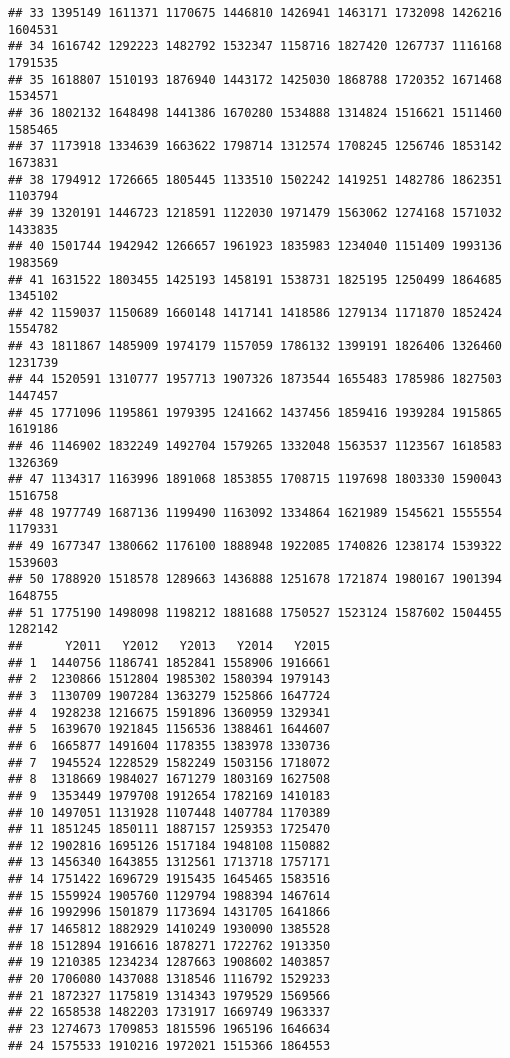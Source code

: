 \documentclass[
]{article}
\begin{document}
\begin{verbatim}
## 33 1395149 1611371 1170675 1446810 1426941 1463171 1732098 1426216 1604531
## 34 1616742 1292223 1482792 1532347 1158716 1827420 1267737 1116168 1791535
## 35 1618807 1510193 1876940 1443172 1425030 1868788 1720352 1671468 1534571
## 36 1802132 1648498 1441386 1670280 1534888 1314824 1516621 1511460 1585465
## 37 1173918 1334639 1663622 1798714 1312574 1708245 1256746 1853142 1673831
## 38 1794912 1726665 1805445 1133510 1502242 1419251 1482786 1862351 1103794
## 39 1320191 1446723 1218591 1122030 1971479 1563062 1274168 1571032 1433835
## 40 1501744 1942942 1266657 1961923 1835983 1234040 1151409 1993136 1983569
## 41 1631522 1803455 1425193 1458191 1538731 1825195 1250499 1864685 1345102
## 42 1159037 1150689 1660148 1417141 1418586 1279134 1171870 1852424 1554782
## 43 1811867 1485909 1974179 1157059 1786132 1399191 1826406 1326460 1231739
## 44 1520591 1310777 1957713 1907326 1873544 1655483 1785986 1827503 1447457
## 45 1771096 1195861 1979395 1241662 1437456 1859416 1939284 1915865 1619186
## 46 1146902 1832249 1492704 1579265 1332048 1563537 1123567 1618583 1326369
## 47 1134317 1163996 1891068 1853855 1708715 1197698 1803330 1590043 1516758
## 48 1977749 1687136 1199490 1163092 1334864 1621989 1545621 1555554 1179331
## 49 1677347 1380662 1176100 1888948 1922085 1740826 1238174 1539322 1539603
## 50 1788920 1518578 1289663 1436888 1251678 1721874 1980167 1901394 1648755
## 51 1775190 1498098 1198212 1881688 1750527 1523124 1587602 1504455 1282142
##      Y2011   Y2012   Y2013   Y2014   Y2015
## 1  1440756 1186741 1852841 1558906 1916661
## 2  1230866 1512804 1985302 1580394 1979143
## 3  1130709 1907284 1363279 1525866 1647724
## 4  1928238 1216675 1591896 1360959 1329341
## 5  1639670 1921845 1156536 1388461 1644607
## 6  1665877 1491604 1178355 1383978 1330736
## 7  1945524 1228529 1582249 1503156 1718072
## 8  1318669 1984027 1671279 1803169 1627508
## 9  1353449 1979708 1912654 1782169 1410183
## 10 1497051 1131928 1107448 1407784 1170389
## 11 1851245 1850111 1887157 1259353 1725470
## 12 1902816 1695126 1517184 1948108 1150882
## 13 1456340 1643855 1312561 1713718 1757171
## 14 1751422 1696729 1915435 1645465 1583516
## 15 1559924 1905760 1129794 1988394 1467614
## 16 1992996 1501879 1173694 1431705 1641866
## 17 1465812 1882929 1410249 1930090 1385528
## 18 1512894 1916616 1878271 1722762 1913350
## 19 1210385 1234234 1287663 1908602 1403857
## 20 1706080 1437088 1318546 1116792 1529233
## 21 1872327 1175819 1314343 1979529 1569566
## 22 1658538 1482203 1731917 1669749 1963337
## 23 1274673 1709853 1815596 1965196 1646634
## 24 1575533 1910216 1972021 1515366 1864553

\end{verbatim}
\end{document}
